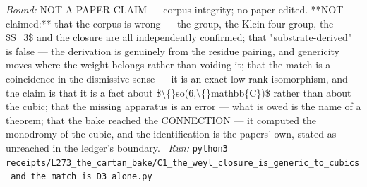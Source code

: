 \begin{description}
 \emph{Bound:} NOT-A-PAPER-CLAIM --- corpus integrity; no paper edited. **NOT claimed:** that the corpus is wrong --- the group, the Klein four-group, the \$S\_3\$ and the closure are all independently confirmed; that "substrate-derived" is false --- the derivation is genuinely from the residue pairing, and genericity moves where the weight belongs rather than voiding it; that the match is a coincidence in the dismissive sense --- it is an exact low-rank isomorphism, and the claim is that it is a fact about \$\textbackslash\{\}so(6,\textbackslash\{\}mathbb\{C\})\$ rather than about the cubic; that the missing apparatus is an error --- what is owed is the name of a theorem; that the bake reached the CONNECTION --- it computed the monodromy of the cubic, and the identification is the papers' own, stated as unreached in the ledger's boundary.
\ \emph{Run:} \texttt{python3 receipts/L273\_the\_cartan\_bake/C1\_the\_weyl\_closure\_is\_generic\_to\_cubics\_and\_the\_match\_is\_D3\_alone.py}
\end{description}\endgroup
